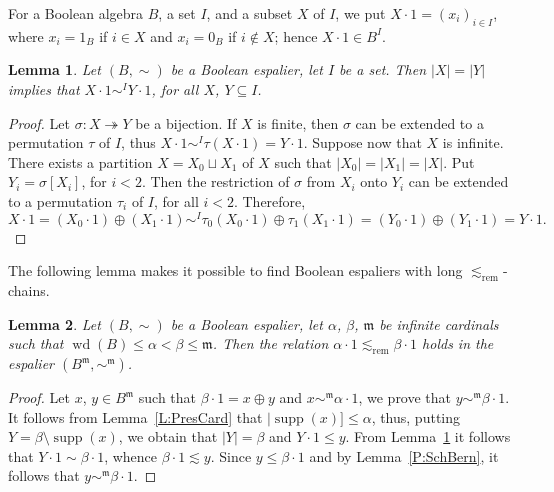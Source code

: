 \documentclass[psamsfonts,reqno]{memo-l}
\theoremstyle{plain}
\newtheorem{lemma}{Lemma}[section]
\theoremstyle{definition}
\theoremstyle{remark}
\numberwithin{equation}{section}
\DeclareMathOperator{\wdt}{wd}
\DeclareMathOperator{\supp}{supp}
\newcommand{\srem}{\lesssim_{\mathrm{rem}}}
\newcommand{\fm}{\mathfrak{m}}
\begin{document}
For a Boolean algebra $B$, a set $I$,
and a subset $X$ of $I$, we put
$X\cdot 1=(x_i)_{i\in I}$, where $x_i=1_B$ if $i\in X$ and $x_i=0_B$ if
$i\notin X$; hence $X\cdot 1\in B^I$.

\begin{lemma}\label{L:X1simY1}
Let $(B,\sim)$ be a Boolean espalier, let $I$ be
a set. Then $|X|=|Y|$ implies that $X\cdot 1\sim^IY\cdot 1$, for all $X$,
$Y\subseteq I$.
\end{lemma}

\begin{proof}
Let $\sigma\colon X\twoheadrightarrow Y$ be a bijection. If $X$ is finite,
then $\sigma$ can be extended to a permutation $\tau$ of $I$, thus
$X\cdot 1\sim^I\tau(X\cdot 1)=Y\cdot 1$.
Suppose now that $X$ is infinite.
There exists a partition $X=X_0\sqcup X_1$ of $X$ such that
$|X_0|=|X_1|=|X|$. Put $Y_i=\sigma[X_i]$, for $i<2$. Then the restriction of
$\sigma$ from $X_i$ onto $Y_i$ can be extended to a permutation $\tau_i$ of
$I$, for all $i<2$. Therefore,
   \begin{equation}
   X\cdot 1=(X_0\cdot 1)\oplus(X_1\cdot 1)\sim^I
   \tau_0(X_0\cdot 1)\oplus\tau_1(X_1\cdot 1)=(Y_0\cdot 1)\oplus(Y_1\cdot 1)
   =Y\cdot 1.\tag*{\qed}
   \end{equation}
\renewcommand{\qed}{}
\end{proof}

The following lemma makes it possible to find Boolean
espaliers with long
$\srem$-chains.

\begin{lemma}\label{L:RemGExt}
Let $(B,\sim)$ be a Boolean espalier, let
$\alpha$, $\beta$, $\fm$ be infinite cardinals such that
$\wdt(B)\leq\alpha<\beta\leq\fm$. Then the relation
$\alpha\cdot 1\srem\beta\cdot 1$ holds in the espalier
$(B^\fm,\sim^\fm)$.
\end{lemma}

\begin{proof}
Let $x$, $y\in B^\fm$ such that $\beta\cdot 1=x\oplus y$ and
$x\sim^\fm\alpha\cdot 1$, we prove that $y\sim^\fm\beta\cdot 1$. It follows
from Lemma~\ref{L:PresCard} that $|\supp(x)]\leq\alpha$, thus, putting
$Y=\beta\setminus\supp(x)$, we obtain that $|Y|=\beta$ and $Y\cdot 1\leq y$.
{}From Lemma~\ref{L:X1simY1} it follows that $Y\cdot 1\sim\beta\cdot 1$,
whence $\beta\cdot 1\lesssim y$. Since $y\leq\beta\cdot 1$ and by
Lemma~\ref{P:SchBern}, it follows that $y\sim^\fm\beta\cdot 1$.
\end{proof}
\end{document}
